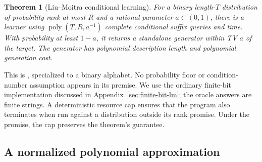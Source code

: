 \documentclass[11pt]{article}
\newcommand{\poly}{\operatorname{poly}}
\newtheorem{theorem}{Theorem}
\theoremstyle{definition}
\theoremstyle{remark}
\begin{document}
\begin{theorem}[Liu--Moitra conditional learning]\label{thm:lm}
For a binary length-$T$ distribution of probability rank at most $R$ and a rational parameter $a\in(0,1)$, there is a learner using $\poly(T,R,a^{-1})$ complete conditional suffix queries and time. With probability at least $1-a$, it returns a standalone generator within TV $a$ of the target. The generator has polynomial description length and polynomial generation cost.
\end{theorem}

This is \citet[Theorem~1.3]{liu-moitra}, specialized to a binary alphabet. No probability floor or condition-number assumption appears in its premise. We use the ordinary finite-bit implementation discussed in Appendix~\ref{sec:finite-bit-lm}; the oracle answers are finite strings. A deterministic resource cap ensures that the program also terminates when run against a distribution outside its rank promise. Under the promise, the cap preserves the theorem's guarantee.

\subsection{A normalized polynomial approximation}
\end{document}
